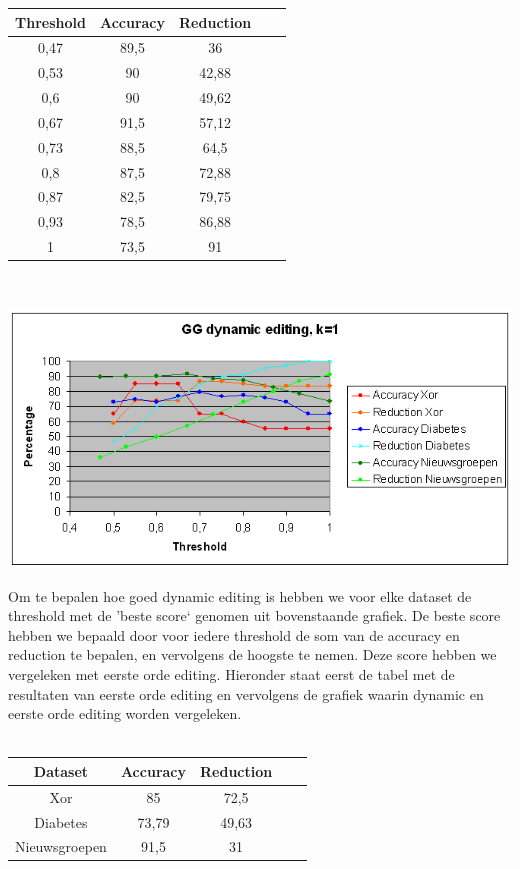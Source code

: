 \documentclass{article}
\begin{document}
\begin{tabular}{|c|c|c|c|c|}  \hline			
Threshold	& Accuracy &	Reduction \\ \hline
0,47 &	89,5 &	36 \\
0,53 &	90 &	42,88 \\
0,6 &	90 &	49,62 \\
0,67 &	91,5 &	57,12 \\
0,73 &	88,5 &	64,5 \\
0,8 &	87,5 &	72,88 \\
0,87 &	82,5 &	79,75 \\
0,93 &	78,5 &	86,88 \\
1 &	73,5 &	91 \\ \hline
\end{tabular} \\

\begin{center} \includegraphics[scale=0.7]{GG_dynamic} \end{center}

Om te bepalen hoe goed dynamic editing is hebben we voor elke dataset de threshold met de 'beste score` genomen uit bovenstaande grafiek. De beste score hebben we bepaald door voor iedere threshold de som van de accuracy en reduction te bepalen, en vervolgens de hoogste te nemen. Deze score hebben we vergeleken met eerste orde editing. Hieronder staat eerst de tabel met de resultaten van eerste orde editing en vervolgens de grafiek waarin dynamic en eerste orde editing worden vergeleken.\\
\\
\begin{tabular}{|c|c|c|c|c|}  \hline			
Dataset	& Accuracy &	Reduction \\ \hline
Xor	& 85 &	72,5 \\
Diabetes &	73,79 &	49,63 \\
Nieuwsgroepen &	91,5 &	31 \\ \hline
\end{tabular} \\
\end{document}
